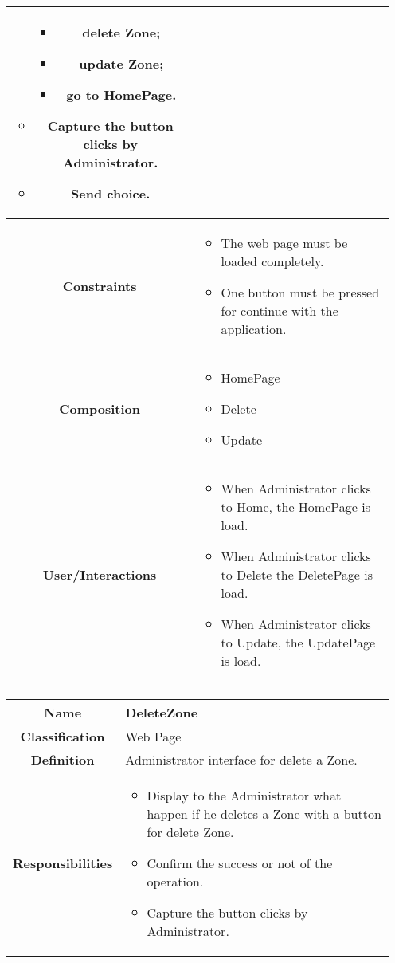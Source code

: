 \documentclass[11pt, a4paper,titlepage]{article}
\begin{document}
\begin{enumerate}
\begin{tabularx}{\textwidth}{| c | X |}
\begin{itemize}
\begin{itemize}
			\item delete Zone;
			\item update Zone;
			\item go to HomePage.
		\end{itemize}
		\item Capture the button clicks by Administrator.
		\item Send choice.
	\end{itemize}
	\\
	\hline
	\textbf{Constraints} &
	\begin{itemize}
		\item  The web page must be loaded completely.
		\item One button must be pressed for continue with the application.
	\end{itemize}
	\\
	\hline
	\textbf{Composition} &
	\begin{itemize}
		\item HomePage
		\item Delete
		\item Update
	\end{itemize}
	\\
	\hline
	\textbf{User/Interactions} &
	\begin{itemize}
		\item When Administrator clicks to Home, the HomePage is load.    	
		\item When Administrator clicks to Delete the DeletePage is load.    	
		\item When Administrator clicks to Update, the UpdatePage is load.
	\end{itemize}
	\\
	\hline 
\end{tabularx}
\begin{tabularx}{\textwidth}{| c | X |}
	\hline
	\textbf{Name} &
	DeleteZone
	\\
	\hline
	\textbf{Classification} &
	Web Page
	\\
	\hline
	\textbf{Definition} &
	Administrator interface for delete a Zone.\\
	\hline
	\textbf{Responsibilities} &
	\begin{itemize}
		\item Display to the Administrator what happen if he deletes a Zone with a button for delete Zone.
		\item Confirm the success or not of the operation.
		\item Capture the button clicks by Administrator.

\end{itemize}
\end{tabularx}
\end{enumerate}
\end{document}
